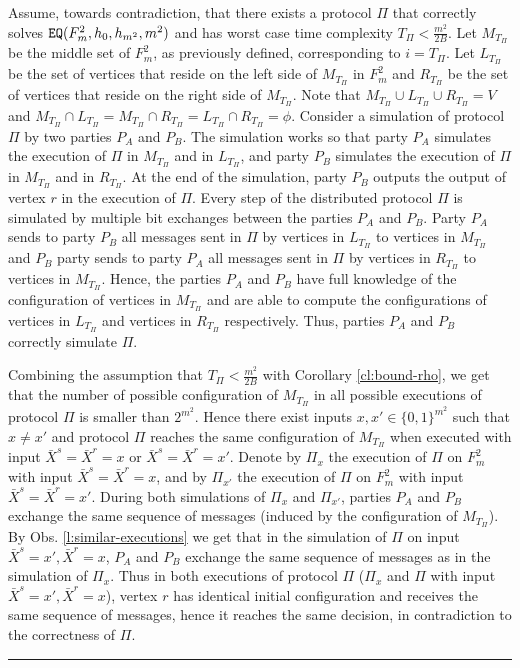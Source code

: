 \documentclass[11pt,letter]{article}
\def\EQ{\mbox{\tt EQ}}
\def\INPUTS{\bar{X}^s}
\def\INPUTR{\bar{X}^r}
\def\partyA{P_A}
\def\partyB{P_B}
\newcommand{\qed}{\rule{7pt}{7pt}}
\newenvironment{proof}{\noindent{\bf Proof}\hspace*{1em}}{\qed\bigskip}
\begin{document}
\begin{proof}
Assume, towards contradiction, that there exists a protocol $\Pi$ that 
correctly solves  $\EQ(F^2_{m},h_0,h_{m^2},m^2)$ and has worst case time complexity 
$T_{\Pi}< \frac{m^2}{2B}$. Let $M_{T_{\Pi}}$ be the middle set of $F_{m}^2$, 
as previously defined, corresponding to $i=T_\Pi$. Let $L_{T_{\Pi}}$ be 
the set of vertices  that reside on the left side of $M_{T_{\Pi}}$ in $F_m^2$ 
and $R_{T_{\Pi}}$ be the set of vertices that reside on the right side of 
$M_{T_{\Pi}}$. Note that $M_{T_{\Pi}}\cup L_{T_{\Pi}}\cup R_{T_{\Pi}}=V$ and 
$M_{T_{\Pi}}\cap L_{T_{\Pi}}=M_{T_{\Pi}}\cap  R_{T_{\Pi}} =
L_{T_{\Pi}} \cap  R_{T_{\Pi}}=\phi$.
Consider a simulation of protocol $\Pi$ by two parties $\partyA$ and $\partyB$.
The simulation works so that party $\partyA$ simulates the execution of $\Pi$ 
in $M_{T_{\Pi}}$ and in $L_{T_{\Pi}}$, and party $\partyB$ simulates the 
execution of $\Pi$ in $M_{T_{\Pi}}$ and in $R_{T_{\Pi}}$. 
At the end of the simulation, party $\partyB$ outputs the output of vertex $r$ 
in the execution of $\Pi$. Every step of the distributed protocol $\Pi$ 
is simulated by multiple bit exchanges between the parties $\partyA$ and $\partyB$. 
Party $\partyA$ sends to party  $\partyB$ all messages sent in $\Pi$ by vertices in 
$L_{T_{\Pi}}$ to vertices in $M_{T_{\Pi}}$ and $\partyB$ party sends to party $\partyA$ 
all messages sent in $\Pi$ by vertices in $R_{T_{\Pi}}$ to vertices in 
$M_{T_{\Pi}}$. Hence, the parties $\partyA$ and $\partyB$ have full knowledge of the 
configuration of vertices in $M_{T_{\Pi}}$ and are able to compute the 
configurations of vertices in $L_{T_{\Pi}}$ and vertices in $R_{T_{\Pi}}$ 
respectively. Thus, parties $\partyA$ and $\partyB$  correctly simulate $\Pi$.

Combining the assumption that $T_\Pi < \frac{m^2}{2B}$ with Corollary 
\ref{cl:bound-rho}, we get that the number of possible configuration of 
$M_{T_{\Pi}}$ in all possible executions of protocol $\Pi$ is smaller than 
$2^{m^2}$. 
Hence there exist inputs ${x},{x}'\in \{0,1\}^{m^2}$ such that ${x}\ne {x}'$ 
and protocol $\Pi$ reaches the same configuration of $M_{T_{\Pi}}$ when 
executed with input 
$\INPUTS=\INPUTR=x$ or $\INPUTS=\INPUTR=x'$. 
Denote by $\Pi_x$ the execution of $\Pi$ on $F_m^2$ with input 
$\INPUTS=\INPUTR=x$, and by $\Pi_{x'}$ the execution of $\Pi$ on $F_m^2$ with 
input $\INPUTS=\INPUTR=x'$.
During both simulations of $\Pi_x$ and $\Pi_{x'}$, parties $\partyA$ and 
$\partyB$ exchange the same sequence of messages (induced by the configuration 
of $M_{T_{\Pi}}$). By Obs. \ref{l:similar-executions} we get that in the 
simulation of $\Pi$ on input 
$\INPUTS=x', \INPUTR=x$, $\partyA$ and $\partyB$ exchange the same 
sequence of messages as in the simulation of $\Pi_x$.  Thus in both executions 
of protocol $\Pi$ ($\Pi_x$ and $\Pi$ with input $\INPUTS=x', \INPUTR=x$), 
vertex $r$ has identical initial configuration and receives the same 
sequence of messages, hence it reaches the same decision,
in contradiction to the correctness of $\Pi$.
\end{proof}
\end{document}
